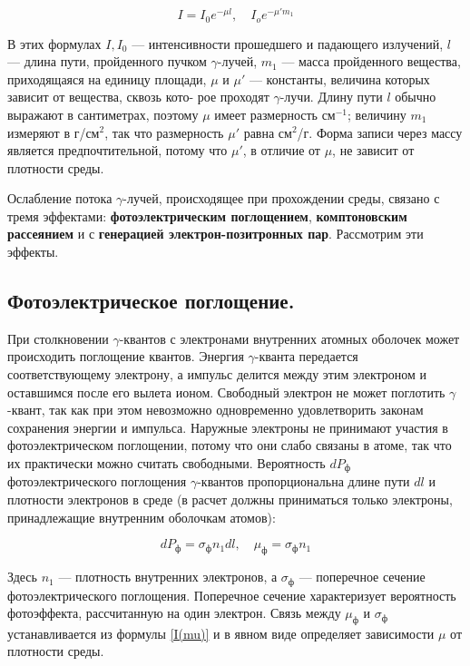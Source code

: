 \documentclass[12pt]{kiarticle} %
\newcommand{\ga}{\ensuremath{\gamma}}
\begin{document}
	\begin{equation}\label{I(mu)}
	I = I_0 e^{-\mu l}, \quad I_o e^{-\mu 'm_1} 
	\end{equation}
	
	В этих формулах $ I, I_0 $ --- интенсивности прошедшего и падающего излучений, $ l $ --- длина пути, пройденного пучком \ga-лучей, $ m_1 $ ---
	масса пройденного вещества, приходящаяся на единицу площади, $ \mu $ и
	$ \mu' $ --- константы, величина которых зависит от вещества, сквозь кото-
	рое проходят \ga-лучи. Длину пути $ l $ обычно выражают в сантиметрах,
	поэтому $ \mu $ имеет размерность см$ ^{-1} $; величину $ m_1 $ измеряют в г/см$ ^2 $,
	так что размерность $ \mu' $ равна см$ ^2 $/г. Форма записи через массу является предпочтительной, потому что $ \mu' $, в отличие от $ \mu $, не зависит от плотности среды. 
	
	Ослабление потока \ga-лучей, происходящее при прохождении среды, связано с тремя эффектами: \textbf{фотоэлектрическим поглощением},
	\textbf{комптоновским рассеянием} и с \textbf{генерацией электрон-позитронных пар}. Рассмотрим эти эффекты.
	
	\subsection{Фотоэлектрическое поглощение.} При столкновении \ga-квантов с
	электронами внутренних атомных оболочек может происходить поглощение квантов. Энергия \ga-кванта передается соответствующему электрону, а импульс делится между этим электроном и оставшимся после
	его вылета ионом. Свободный электрон не может поглотить \ga-квант,
	так как при этом невозможно одновременно удовлетворить законам
	сохранения энергии и импульса. Наружные электроны не принимают участия в фотоэлектрическом поглощении, потому что они слабо
	связаны в атоме, так что их практически можно считать свободными.
	Вероятность $ dP_ф $ фотоэлектрического поглощения \ga-квантов пропорциональна длине пути $ dl $ и плотности электронов в среде (в расчет
	должны приниматься только электроны, принадлежащие внутренним
	оболочкам атомов):
	
	\begin{equation}\label{mu ph}
	dP_ф = \sigma_ф n_1 dl, \quad \mu_ф = \sigma_ф n_1
	\end{equation}
	
	Здесь $ n_1 $ --- плотность внутренних электронов, а $ \sigma_ф $ --- поперечное сечение фотоэлектрического поглощения. Поперечное сечение характеризует вероятность фотоэффекта, рассчитанную на один электрон. Связь между $ \mu_ф $ и $ \sigma_ф $ устанавливается из формулы \eqref{I(mu)} и в явном виде определяет зависимости $ \mu $ от плотности среды.
	
\end{document}
